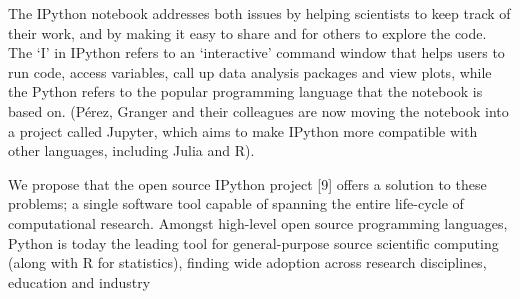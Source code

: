 The IPython notebook addresses both issues
by helping scientists to keep track of their work,
and by making it easy to share and for others
to explore the code. The ‘I’ in IPython refers to
an ‘interactive’ command window that helps
users to run code, access variables, call up data
analysis packages and view plots, while the
Python refers to the popular programming
language that the notebook is based on. (Pérez,
Granger and their colleagues are now moving
the notebook into a project called Jupyter, which
aims to make IPython more compatible with
other languages, including Julia and R). \cite{perez2013open}

We propose that the open source IPython project [9] offers a solution to these problems; a single software tool capable of spanning the entire life-cycle of computational research. Amongst high-level open source programming languages, Python is today the leading tool for general-purpose source scientific computing (along with R for statistics), finding wide adoption across research disciplines, education and industry 
